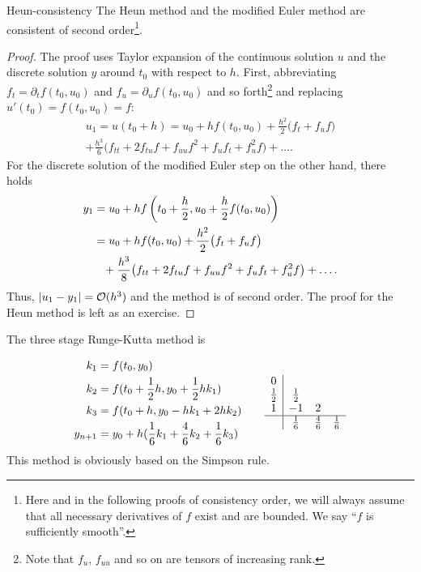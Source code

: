 \begin{Lemma}{Heun-consistency}
  The Heun method and the modified Euler method are consistent of second
  order\footnote{Here and in the following proofs of consistency
    order, we will always assume that all necessary derivatives of $f$
  exist and are bounded. We say ``$f$ is sufficiently smooth''.}.
\end{Lemma}

\begin{proof}
  The proof uses Taylor expansion of the continuous solution $u$ and
  the discrete solution $y$ around $t_0$ with respect to $h$. First,
  abbreviating $f_t = \partial_t f(t_0,u_0)$ and
  $f_u = \partial_u f(t_0,u_0)$ and so forth\footnote{Note that $f_u$,
    $f_{u u}$ and so on are tensors of increasing rank.} and replacing
  $u'(t_0)=f(t_0,u_0) = f$:
  \begin{multline}
    \label{eq:explicit:4}
    u_1 = u(t_0+h) = u_0 + h f(t_0, u_0)
    + \frac{h^2}2\bigl(f_t + f_u f\bigr)
    \\
    + \frac{h^3}6\bigl(f_{t t}+2f_{t u}f+f_{u u}f^2+f_u f_t+f_u^2f\bigr)
    + \dots.
  \end{multline}
  For the discrete solution of the modified Euler step on the other
  hand, there holds
  \begin{align*}
    y_1 &= u_0 + h f\left(t_0+\frac h2, u_0+\frac h2 f(t_0,u_0)\right)
    \\
    &= u_0 + h f(t_0, u_0) + \frac{h^2}2 \bigl(f_t + f_u f\bigr)
    \\&\hphantom{...}
      + \frac{h^3}8\bigl(f_{t t}+2f_{t u}f+f_{u u}f^2+f_u f_t+f_u^2f\bigr)
        +\dots.
  \end{align*}
  Thus, $\lvert u_1-y_1\rvert = \mathcal O(h^3)$ and the method is of second
  order. The proof for the Heun method is left as an exercise.
\end{proof}

\begin{example}
  The three stage Runge-Kutta method is

  \begin{gather*}
    \begin{aligned}
      k_1 & = f(t_0, y_0) \\
      k_2 & = f(t_0 + \frac12 h, y_0 + \frac12 h k_1) \\
      k_3 & = f(t_0 + h, y_0 - h k_1 + 2 h k_2) \\
      y_{n+1} & = y_0 + h ( \frac16 k_1 + \frac46 k_2 + \frac16 k_3 ) \\
    \end{aligned}
    \qquad
    \begin{array}{c|ccc}
      0 & \\
      \frac12 & \frac12 \\
      1 & -1 & 2 \\
      \hline
        & \frac16 & \frac46 & \frac16 \\
    \end{array}
  \end{gather*}
  This method is obviously based on the Simpson rule.
\end{example}

